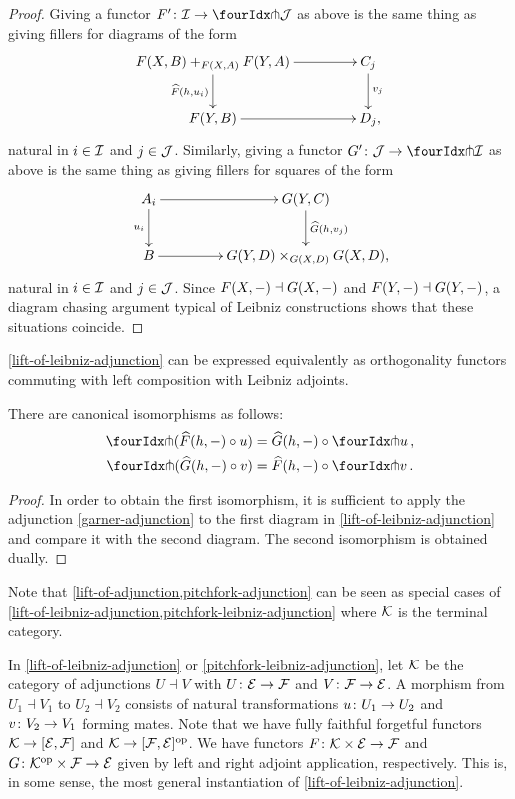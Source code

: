 \documentclass[reqno,10pt,a4paper,oneside,draft]{amsart}
\begin{document}
\begin{proof}
Giving a functor $F' \co \cal{I} \to \liftl{\cal{J}}$ as above is the same thing as giving fillers for diagrams of the form
\[
\xymatrix@C+2em{
  F(X,B) +_{F(X,A)} F(Y,A)
  \ar[d]_{\widehat{F}(h, u_i)}
  \ar[r]
&
  C_j
  \ar[d]^{v_j}
\\
  F(Y, B)
  \ar[r]
&
  D_j \rlap{,}
}
\]
natural in $i \in \cal{I}$ and $j \in \cal{J}$.
Similarly, giving a functor $G' \co \cal{J} \to \liftl{\cal{I}}$ as above is the same thing as giving fillers for squares of the form
\[
\xymatrix@C+2em{
  A_i
  \ar[d]_{u_i}
  \ar[r]
&
  G(Y, C)
  \ar[d]^{\widehat{G}(h, v_j)}
\\
  B
  \ar[r]
&
  G(Y,D) \times_{G(X,D)} G(X,D) \rlap{,}
}
\]
natural in $i \in \cal{I}$ and $j \in \cal{J}$.
Since $F(X, \arghole) \dashv G(X, \arghole)$ and $F(Y, \arghole) \dashv G(Y, \arghole)$, a diagram chasing argument typical of Leibniz constructions shows that these situations coincide.
\end{proof}

\cref{lift-of-leibniz-adjunction} can be expressed equivalently as orthogonality functors commuting with left composition with Leibniz adjoints.

\begin{corollary} \label{pitchfork-leibniz-adjunction} There are canonical isomorphisms as follows:
\begin{align*}
  \liftr{(\widehat{F}(h, -) \cc u)} &= \widehat{G}(h, -) \cc \liftr{u}
\, ,\\
  \liftl{(\widehat{G}(h, -) \cc v)} &= \widehat{F}(h, -) \cc \liftl{v}
\, .
\end{align*}
\end{corollary}

\begin{proof}
In order to obtain the first isomorphism, it is sufficient to apply the adjunction \eqref{garner-adjunction} to the first diagram in \cref{lift-of-leibniz-adjunction} and compare it with the second diagram.
The second isomorphism is obtained dually.
\end{proof}

Note that \cref{lift-of-adjunction,pitchfork-adjunction} can be seen as special cases of \cref{lift-of-leibniz-adjunction,pitchfork-leibniz-adjunction} where $\cal{K}$ is the terminal category.

\begin{remark} \label{pitchfork-leibniz-most-general-example}
In \cref{lift-of-leibniz-adjunction} or \cref{pitchfork-leibniz-adjunction}, let $\cal{K}$ be the category of adjunctions $U \dashv V$ with $U \co \catE \to \cal{F}$ and $V \co \cal{F} \to \catE$.
A morphism from $U_1 \dashv V_1$ to $U_2 \dashv V_2$ consists of natural transformations $u \co U_1 \to U_2$ and $v \co V_2 \to V_1$ forming mates.
Note that we have fully faithful forgetful functors $\cal{K} \to [\catE, \cal{F}]$ and $\cal{K} \to [\cal{F}, \catE]^{\op}$.
We have functors $F \co \cal{K} \times \catE \to \cal{F}$ and $G \co \cal{K}^{\op} \times \cal{F} \to \catE$ given by left and right adjoint application, respectively.
This is, in some sense, the most general instantiation of \cref{lift-of-leibniz-adjunction}.
\end{remark}
\end{document}
